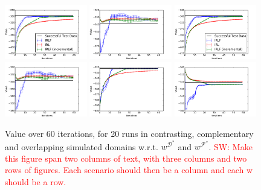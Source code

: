\documentclass{aamas2016}
\newcommand{\sw}[1]{\textcolor{red}{SW: #1}}
\newcommand{\sw}[1]{}
\begin{document}
\begin{figure}[t]
  \centering
    \includegraphics[clip=true,width=0.32\textwidth]{images/expert_apprentice_contrastive.pdf}
    \includegraphics[clip=true,width=0.32\textwidth]{images/taboo_apprentice_contrastive.pdf}
    \includegraphics[clip=true,width=0.32\textwidth]{images/expert_apprentice_contrastive.pdf}
    \includegraphics[clip=true,width=0.32\textwidth]{images/taboo_apprentice_contrastive.pdf}
    \includegraphics[clip=true,width=0.32\textwidth]{images/expert_apprentice_complementary.pdf}
    \includegraphics[clip=true,width=0.32\textwidth]{images/taboo_apprentice_complementary.pdf}
  \caption{Value over 60 iterations, for 20 runs in contrasting, complementary and overlapping simulated domains w.r.t. $w^{\mathcal{D}^*}$ and $w^{\mathcal{F}^*}$. \sw{Make this figure span two columns of text, with three columns and two rows of figures.  Each scenario should then be a column and each w should be a row.}  }
  \label{fig:complementary}

\end{figure}
\end{document}
